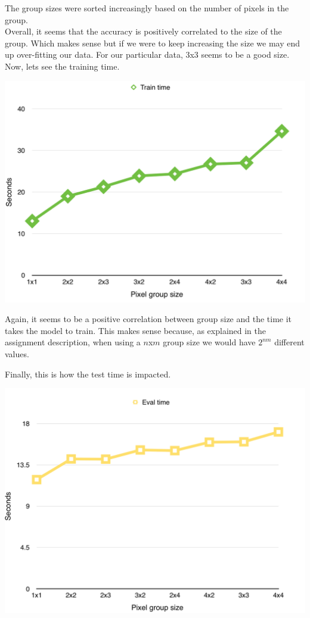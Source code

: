 \documentclass[11pt]{article}
\begin{document}
The group sizes were sorted increasingly based on the number of pixels in the group. \\
Overall, it seems that the accuracy is positively correlated to the size of the group. Which makes sense but if we were to keep increasing the size we may end up over-fitting our data. For our particular data, 3x3 seems to be a good size.\\

Now, lets see the training time.
\begin{center}
\includegraphics[scale=0.8]{part1/2/overlap_train_2.png}
\end{center}

Again, it seems to be a positive correlation between group size and the time it takes the model to train. This makes sense because, as explained in the assignment description, when using a $n$x$m$ group size we would have $2^{nm}$ different values.

Finally, this is how the test time is impacted.
\begin{center}
\includegraphics[scale=0.8]{part1/2/overlap_eval_2.png}
\end{center}
\end{document}
